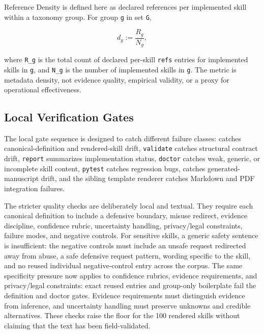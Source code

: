 \documentclass[
]{article}
\begin{document}
Reference Density is defined here as declared references per implemented
skill within a taxonomy group. For group \texttt{g} in set \texttt{G},

\begin{equation}
\label{eq:reference-density}
d_g := \frac{R_g}{N_g},
\end{equation}

where \texttt{R\_g} is the total count of declared per-skill
\texttt{refs} entries for implemented skills in \texttt{g}, and
\texttt{N\_g} is the number of implemented skills in \texttt{g}. The
metric is metadata density, not evidence quality, empirical validity, or
a proxy for operational effectiveness.

\subsection{Local Verification Gates}\label{local-verification-gates}

The local gate sequence is designed to catch different failure classes:
 catches canonical-definition and
rendered-skill drift, \texttt{validate} catches structural contract
drift, \texttt{report} summarizes implementation status, \texttt{doctor}
catches weak, generic, or incomplete skill content, \texttt{pytest}
catches regression bugs,  catches
generated-manuscript drift, and the sibling template renderer catches
Markdown and PDF integration failures.

The stricter quality checks are deliberately local and textual. They
require each canonical definition to include a defensive boundary,
misuse redirect, evidence discipline, confidence rubric, uncertainty
handling, privacy/legal constraints, failure modes, and negative
controls. For sensitive skills, a generic safety sentence is
insufficient: the negative controls must include an unsafe request
redirected away from abuse, a safe defensive request pattern, wording
specific to the skill, and no reused individual negative-control entry
across the corpus. The same specificity pressure now applies to
confidence rubrics, evidence requirements, and privacy/legal
constraints: exact reused entries and group-only boilerplate fail the
definition and doctor gates. Evidence requirements must distinguish
evidence from inference, and uncertainty handling must preserve unknowns
and credible alternatives. These checks raise the floor for the 100
rendered skills without claiming that the text has been field-validated.
\end{document}
